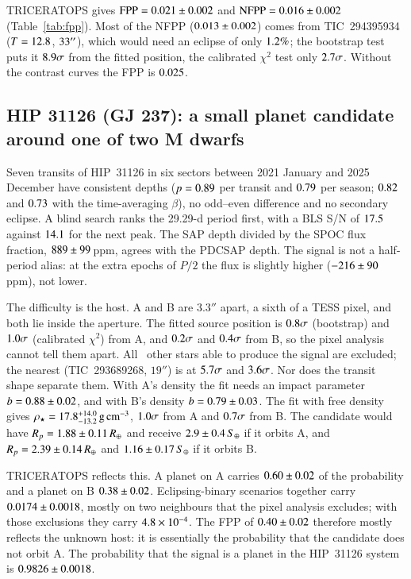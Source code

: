 \documentclass[twocolumn,numberedappendix,appendixfloats]{openjournal}
\newcommand{\rearth}{R_{\oplus}}
\newcommand{\gcc}{\,\mathrm{g\,cm^{-3}}}
\begin{document}
TRICERATOPS gives $\mathrm{FPP} = 0.021 \pm 0.002$ and $\mathrm{NFPP} = 0.016 \pm 0.002$
(Table~\ref{tab:fpp}). Most of the NFPP ($0.013 \pm 0.002$) comes from
TIC~294395934 ($T = 12.8$, $33''$), which would need an eclipse of only
$1.2\%$; the bootstrap test puts it $8.9\sigma$ from the fitted
position, the calibrated $\chi^2$ test only $2.7\sigma$. Without the
contrast curves the FPP is $0.025$.

\subsection{HIP 31126 (GJ 237): a small planet candidate around one of two M dwarfs}
\label{sec:hip}

Seven transits of HIP~31126 in six sectors between 2021 January and 2025
December have consistent depths ($p = 0.89$ per transit and $0.79$ per
season; $0.82$ and $0.73$ with the time-averaging $\beta$), no
odd--even difference and no secondary eclipse. A blind search ranks the
29.29-d period first, with a BLS S/N of $17.5$ against $14.1$
for the next peak. The SAP depth divided by the SPOC flux fraction,
$889 \pm 99$\,ppm, agrees with the PDCSAP depth. The signal is not a half-period
alias: at the extra epochs of $P/2$ the flux is slightly higher
($-216 \pm 90$\,ppm), not lower.

The difficulty is the host. A and B are $3.3''$ apart, a sixth of a TESS
pixel, and both lie inside the aperture. The fitted source position is
$0.8\sigma$ (bootstrap) and $1.0\sigma$ (calibrated $\chi^2$)
from A, and $0.2\sigma$ and $0.4\sigma$ from B, so the
pixel analysis cannot tell them apart. All \nnbxHp\ other stars able to produce
the signal are excluded; the nearest (TIC~293689268, $19''$) is at
$5.7\sigma$ and $3.6\sigma$. Nor does the transit shape separate them. With A's
density the fit needs an impact parameter $b = 0.88 \pm 0.02$, and with B's density
$b = 0.79 \pm 0.03$. The fit with free density gives $\rho_\star = \rhofreeHp\gcc$,
$1.0\sigma$ from A and $0.7\sigma$ from B. The candidate
would have $R_p = \RpHp\,\rearth$ and receive $2.9 \pm 0.4\,S_\oplus$ if it orbits A,
and $R_p = \RpHpB\,\rearth$ and $1.16 \pm 0.17\,S_\oplus$ if it orbits B.

TRICERATOPS reflects this. A planet on A carries $0.60 \pm 0.02$ of the
probability and a planet on B $0.38 \pm 0.02$. Eclipsing-binary scenarios together
carry $0.0174 \pm 0.0018$, mostly on two neighbours that the pixel analysis excludes;
with those exclusions they carry $4.8\times10^{-4}$. The FPP of $0.40 \pm 0.02$ therefore mostly reflects the
unknown host: it is essentially the probability that the candidate does not
orbit A. The probability that the signal is a planet in the HIP~31126 system
is $0.9826 \pm 0.0018$.
\end{document}
